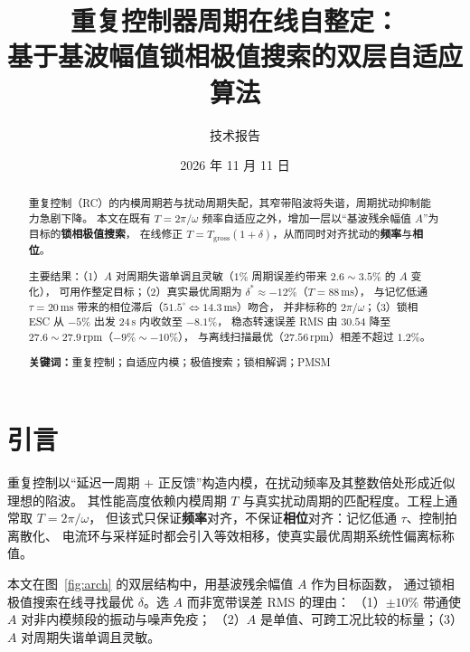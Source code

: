\documentclass[UTF8,fontset=windows,a4paper,11pt]{ctexart}
\title{\bfseries 重复控制器周期在线自整定：\\
基于基波幅值锁相极值搜索的双层自适应算法}
\author{技术报告}
\date{2026 年 11 月 11 日}
\newcommand{\Tg}{T_{\mathrm{gross}}}
\begin{document}
\maketitle

\begin{abstract}
重复控制（RC）的内模周期若与扰动周期失配，其窄带陷波将失谐，周期扰动抑制能力急剧下降。
本文在既有 $T=2\pi/\omega$ 频率自适应之外，增加一层以“基波残余幅值 $A$”为目标的\textbf{锁相极值搜索}，
在线修正 $T=\Tg(1+\delta)$，从而同时对齐扰动的\textbf{频率}与\textbf{相位}。

主要结果：（1）$A$ 对周期失谐单调且灵敏（$1\%$ 周期误差约带来 $2.6\sim3.5\%$ 的 $A$ 变化），
可用作整定目标；（2）真实最优周期为 $\delta^{*}\approx-12\%$（$T=88$\,ms），
与记忆低通 $\tau=20$\,ms 带来的相位滞后（$51.5^{\circ}\Leftrightarrow14.3$\,ms）吻合，
并非标称的 $2\pi/\omega$；（3）锁相 ESC 从 $-5\%$ 出发 24\,s 内收敛至 $-8.1\%$，
稳态转速误差 RMS 由 $30.54$ 降至 $27.6\sim27.9$\,rpm（$-9\%\sim-10\%$），
与离线扫描最优（$27.56$\,rpm）相差不超过 $1.2\%$。

\vspace{4pt}
\noindent\textbf{关键词：}重复控制；自适应内模；极值搜索；锁相解调；PMSM
\end{abstract}

\section{引言}

重复控制以“延迟一周期 + 正反馈”构造内模，在扰动频率及其整数倍处形成近似理想的陷波。
其性能高度依赖内模周期 $T$ 与真实扰动周期的匹配程度。工程上通常取 $T=2\pi/\omega$，
但该式只保证\textbf{频率}对齐，不保证\textbf{相位}对齐：记忆低通 $\tau$、控制拍离散化、
电流环与采样延时都会引入等效相移，使真实最优周期系统性偏离标称值。

本文在图~\ref{fig:arch} 的双层结构中，用基波残余幅值 $A$ 作为目标函数，
通过锁相极值搜索在线寻找最优 $\delta$。选 $A$ 而非宽带误差 RMS 的理由：
（1）$\pm10\%$ 带通使 $A$ 对非内模频段的振动与噪声免疫；
（2）$A$ 是单值、可跨工况比较的标量；（3）$A$ 对周期失谐单调且灵敏。
\end{document}
